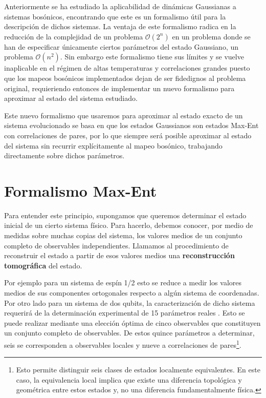 \documentclass{report} %
\numberwithin{equation}{section}
\begin{document}
Anteriormente se ha estudiado la aplicabilidad de dinámicas Gaussianas a sistemas bosónicos, encontrando que este es un formalismo útil para la descripción de dichos sistemas. La ventaja de este formalismo radica en la reducción de la complejidad de un problema $\mathcal{O}(2^n)$ en un problema donde se han de especificar únicamente ciertos parámetros del estado Gaussiano, un problema $\mathcal{O}(n^2)$. Sin embargo este formalismo tiene sus límites y se vuelve inaplicable en el régimen de altas temperaturas y correlaciones grandes puesto que los mapeos bosónicos implementados dejan de ser fidedignos al problema original, requieriendo entonces de implementar un nuevo formalismo para aproximar al estado del sistema estudiado.

Este nuevo formalismo que usaremos para aproximar al estado exacto de un sistema evolucionado se basa en que los estados Gaussianos son estados Max-Ent con correlaciones de pares, por lo que siempre será posible aproximar al estado del sistema sin recurrir explícitamente al mapeo bosónico, trabajando directamente sobre dichos parámetros.

\clearpage

\section{Formalismo Max-Ent}
\label{ch_Max-Ent1}

Para entender este principio, supongamos que queremos determinar el estado inicial de un cierto sistema físico. Para hacerlo, debemos conocer, por medio de medidas sobre muchas copias del sistema, los valores medios de un conjunto completo de observables independientes. Llamamos al procedimiento de reconstruir el estado a partir de esos valores medios una \textbf{reconstrucción tomográfica} \cite{Nielsen.00} del estado.

Por ejemplo para un sistema de espín 1/2 esto se reduce a medir los valores medios de sus componentes ortogonales respecto a algún sistema de coordenadas. Por otro lado para un sistema de dos qubits, la caracterización de dicho sistema requerirá de la determinación experimental de 15 parámetros reales  \cite{Nielsen.00, mQC_Brylinski}.
Esto se puede realizar mediante una elección óptima de cinco observables que constituyen un conjunto completo de observables. De estos quince parámetros a determinar, seis se corresponden a observables locales y nueve a correlaciones de pares\footnote{Esto permite distinguir seis clases de estados localmente equivalentes. En este caso, la equivalencia local implica que existe una diferencia topológica y geométrica entre estos estados y, no una diferencia fundamentalmente física.}.
 
\end{document}
